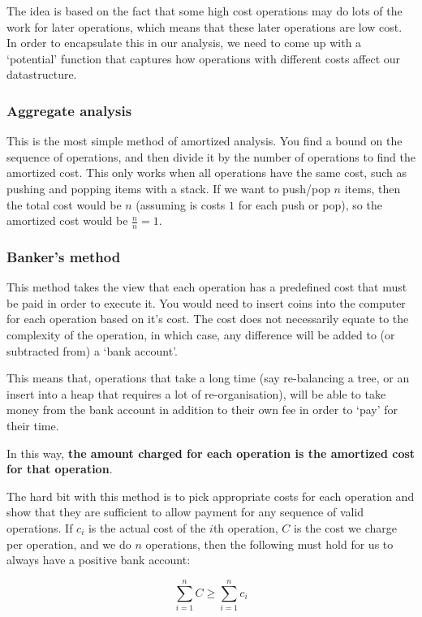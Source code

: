 The idea is based on the fact that some high cost operations may do lots of the
work for later operations, which means that these later operations are low cost.
In order to encapsulate this in our analysis, we need to come up with a
`potential' function that captures how operations with different costs affect
our datastructure.

\subsubsection{Aggregate analysis}

This is the most simple method of amortized analysis. You find a bound on the
sequence of operations, and then divide it by the number of operations to find
the amortized cost. This only works when all operations have the same cost, such
as pushing and popping items with a stack. If we want to push/pop $n$ items,
then the total cost would be $n$ (assuming is costs $1$ for each push or pop),
so the amortized cost would be $\frac{n}{n} = 1$.

\subsubsection{Banker's method}

This method takes the view that each operation has a predefined cost that must
be paid in order to execute it. You would need to insert coins into the computer
for each operation based on it's cost. The cost does not necessarily equate to
the complexity of the operation, in which case, any difference will be added to
(or subtracted from) a `bank account'.

This means that, operations that take a long time (say re-balancing a tree, or
an insert into a heap that requires a lot of re-organisation), will be able to
take money from the bank account in addition to their own fee in order to `pay'
for their time.

In this way, \textbf{the amount charged for each operation is the amortized cost
for that operation}.

The hard bit with this method is to pick appropriate costs for each operation
and show that they are sufficient to allow payment for any sequence of valid
operations. If $c_i$ is the actual cost of the $i$th operation, $C$ is the cost
we charge per operation, and we do $n$ operations, then the following must hold
for us to always have a positive bank account:

\[
  \sum\limits_{i = 1}^nC \geq \sum\limits_{i=1}^nc_i
\]


